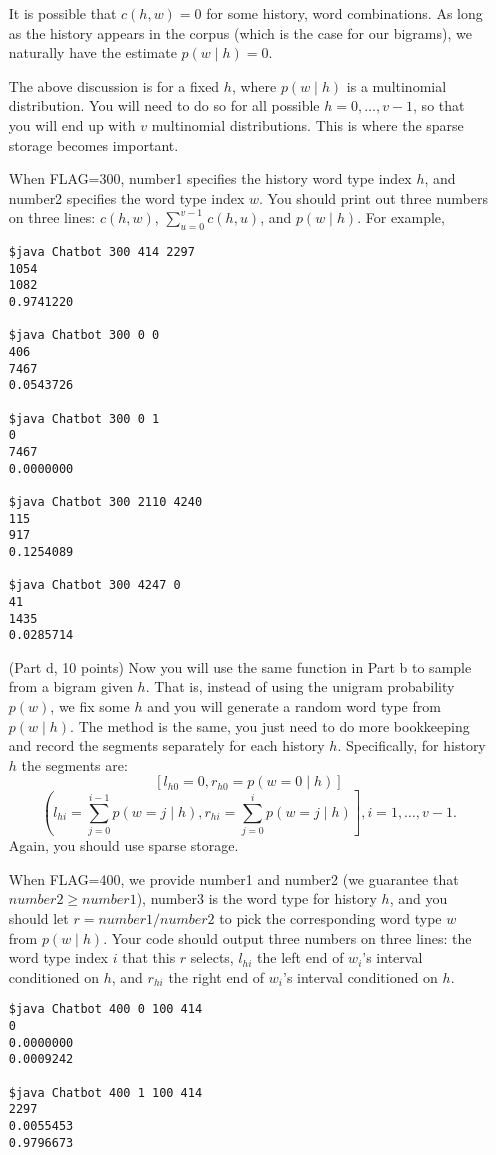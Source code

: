 \documentclass{article}
\begin{document}
\begin{itemize}
It is possible that $c(h,w)=0$ for some history, word combinations.  As long as the history appears in the corpus (which is the case for our bigrams), we naturally have the estimate $p(w\mid h)=0$.

The above discussion is for a fixed $h$, where $p(w \mid h)$ is a multinomial distribution.
You will need to do so for all possible $h=0, \ldots, v-1$, so that you will end up with $v$ multinomial distributions.
This is where the sparse storage becomes important.

When FLAG=300, number1 specifies the history word type index $h$, and number2 specifies the word type index $w$.  You should print out three numbers on three lines: $c(h,w)$, $\sum_{u=0}^{v-1} c(h,u)$, and $p(w\mid h)$.
For example,
\begin{verbatim}
$java Chatbot 300 414 2297
1054
1082
0.9741220

$java Chatbot 300 0 0 
406
7467
0.0543726

$java Chatbot 300 0 1
0
7467
0.0000000

$java Chatbot 300 2110 4240
115
917
0.1254089

$java Chatbot 300 4247 0
41
1435
0.0285714
\end{verbatim}

\item[(Part d, 10 points)]
Now you will use the same function in Part b to sample from a bigram given $h$.
That is, instead of using the unigram probability $p(w)$, we fix some $h$ and you will generate a random word type from $p(w \mid h)$.
The method is the same, you just need to do more bookkeeping and record the segments separately for each history $h$.
Specifically, for history $h$ the segments are:
$$[l_{h0}=0, r_{h0}=p(w=0 \mid h)]$$
$$\left(l_{hi}=\sum_{j=0}^{i-1} p(w=j \mid h), r_{hi}= \sum_{j=0}^{i} p(w=j \mid h)\right], i=1, \ldots, v-1.$$
Again, you should use sparse storage.

When FLAG=400, we provide number1 and number2 (we guarantee that $number2 \ge number1$), number3 is the word type for history $h$, and you should let $r=number1/number2$ to pick the corresponding word type $w$ from $p(w\mid h)$.
Your code should output three numbers on three lines: the word type index $i$ that this $r$ selects, $l_{hi}$ the left end of $w_i$'s interval conditioned on $h$, and $r_{hi}$ the right end of $w_i$'s interval conditioned on $h$.
\begin{verbatim}
$java Chatbot 400 0 100 414
0
0.0000000
0.0009242

$java Chatbot 400 1 100 414
2297
0.0055453
0.9796673


\end{verbatim}
\end{itemize}
\end{document}
